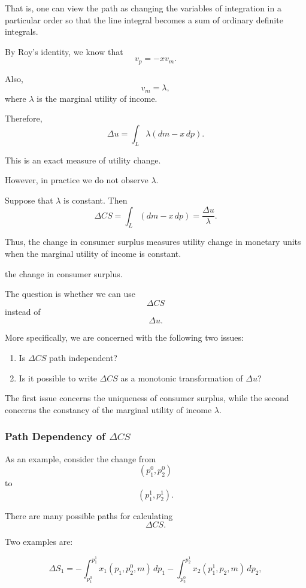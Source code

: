 That is, one can view the path as changing the variables of integration in a particular order so that the line integral becomes a sum of ordinary definite integrals.

By Roy's identity, we know that
\[
v_p=-xv_m.
\]

Also,
\[
v_m=\lambda,
\]
where \(\lambda\) is the marginal utility of income.

Therefore,
\[
\Delta u
=
\int_L \lambda(dm-x\,dp).
\]

This is an exact measure of utility change.

However, in practice we do not observe \(\lambda\).

Suppose that \(\lambda\) is constant. Then
\[
\Delta CS
=
\int_L (dm-x\,dp)
=
\frac{\Delta u}{\lambda}.
\]

Thus, the change in consumer surplus measures utility change in monetary units when the marginal utility of income is constant.



the change in consumer surplus.

The question is whether we can use
\[
\Delta CS
\]
instead of
\[
\Delta u.
\]

More specifically, we are concerned with the following two issues:

\begin{enumerate}
    \item Is \(\Delta CS\) path independent? 
    \item Is it possible to write \(\Delta CS\) as a monotonic transformation of \(\Delta u\)?
\end{enumerate}

The first issue concerns the uniqueness of consumer surplus, while the second concerns the constancy of the marginal utility of income \(\lambda\).

\subsubsection{Path Dependency of \(\Delta CS\)}

As an example, consider the change from
\[
(p_1^0,p_2^0)
\]
to
\[
(p_1^1,p_2^1).
\]

There are many possible paths for calculating
\[
\Delta CS.
\]

Two examples are:

\[
\Delta S_1
=
-
\int_{p_1^0}^{p_1^1}
x_1(p_1,p_2^0,m)\,dp_1
-
\int_{p_2^0}^{p_2^1}
x_2(p_1^1,p_2,m)\,dp_2,
\]

